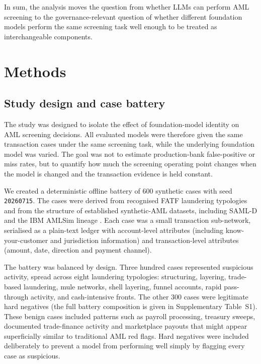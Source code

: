 \documentclass[pdflatex,sn-basic,Numbered]{sn-jnl}
\begin{document}
In sum, the analysis moves the question from whether LLMs can perform AML screening to the governance-relevant question of whether different foundation models perform the same screening task well enough to be treated as interchangeable components.

\section{Methods}\label{sec:methods}

\subsection{Study design and case battery}

The study was designed to isolate the effect of foundation-model identity on AML screening decisions. All evaluated models were therefore given the same transaction cases under the same screening task, while the underlying foundation model was varied. The goal was not to estimate production-bank false-positive or miss rates, but to quantify how much the screening operating point changes when the model is changed and the transaction evidence is held constant.

We created a deterministic offline battery of 600 synthetic cases with seed \texttt{20260715}. The cases were derived from recognised FATF laundering typologies and from the structure of established synthetic-AML datasets, including SAML-D and the IBM AMLSim lineage \cite{samld,weber2018}. Each case was a small transaction sub-network, serialised as a plain-text ledger with account-level attributes (including know-your-customer and jurisdiction information) and transaction-level attributes (amount, date, direction and payment channel).

The battery was balanced by design. Three hundred cases represented suspicious activity, spread across eight laundering typologies: structuring, layering, trade-based laundering, mule networks, shell layering, funnel accounts, rapid pass-through activity, and cash-intensive fronts. The other 300 cases were legitimate hard negatives (the full battery composition is given in Supplementary Table~S1). These benign cases included patterns such as payroll processing, treasury sweeps, documented trade-finance activity and marketplace payouts that might appear superficially similar to traditional AML red flags. Hard negatives were included deliberately to prevent a model from performing well simply by flagging every case as suspicious.
\end{document}
